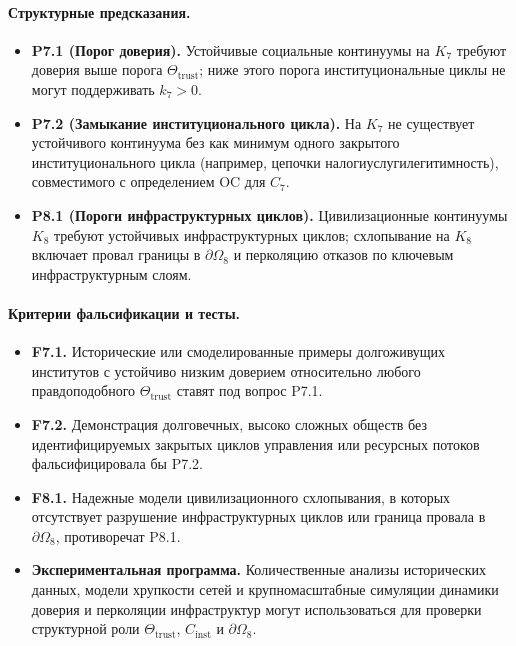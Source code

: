 \paragraph{Структурные предсказания.}
\begin{itemize}
  \item \textbf{P7.1 (Порог доверия).}
        Устойчивые социальные континуумы на \(K_7\) требуют доверия выше
        порога \(\Theta_{\mathrm{trust}}\); ниже этого порога институциональные
        циклы не могут поддерживать \(k_7>0\).
  \item \textbf{P7.2 (Замыкание институционального цикла).}
        На \(K_7\) не существует устойчивого континуума без как минимум
        одного закрытого институционального цикла (например,
        цепочки налоги\textendash услуги\textendash легитимность), совместимого
        с определением OC для \(C_7\).
  \item \textbf{P8.1 (Пороги инфраструктурных циклов).}
        Цивилизационные континуумы \(K_8\) требуют устойчивых
        инфраструктурных циклов; схлопывание на \(K_8\) включает провал границы
        в \(\partial\Omega_8\) и перколяцию отказов по ключевым
        инфраструктурным слоям.
\end{itemize}

\paragraph{Критерии фальсификации и тесты.}
\begin{itemize}
  \item \textbf{F7.1.}
        Исторические или смоделированные примеры долгоживущих институтов с
        устойчиво низким доверием относительно любого правдоподобного
        \(\Theta_{\mathrm{trust}}\) ставят под вопрос P7.1.
  \item \textbf{F7.2.}
        Демонстрация долговечных, высоко сложных обществ без идентифицируемых
        закрытых циклов управления или ресурсных потоков фальсифицировала бы
        P7.2.
  \item \textbf{F8.1.}
        Надежные модели цивилизационного схлопывания, в которых отсутствует
        разрушение инфраструктурных циклов или граница провала в
        \(\partial\Omega_8\), противоречат P8.1.
  \item \textbf{Экспериментальная программа.}
        Количественные анализы исторических данных, модели хрупкости сетей и
        крупномасштабные симуляции динамики доверия и перколяции
        инфраструктур могут использоваться для проверки структурной роли
        \(\Theta_{\mathrm{trust}}\), \(C_{\mathrm{inst}}\) и
        \(\partial\Omega_8\).
\end{itemize}

